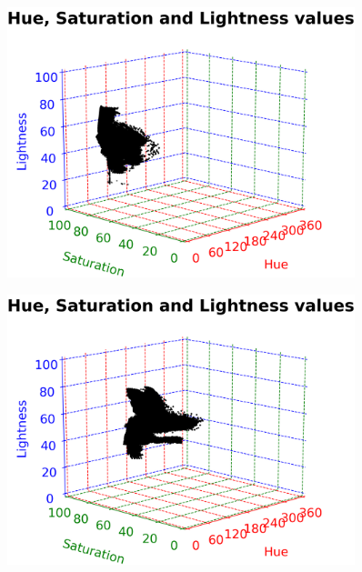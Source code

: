 \vspace{1mm}

\begin{figure}[h!]
	\centering
	\begin{minipage}{0.5\textwidth}
		\centering
		\includegraphics[width=0.9\textwidth]{img/hsl3DGreen.png}
		\captionsetup{width=0.9\textwidth}
		\label{hsl3DGreenPlot}
	\end{minipage}%
	\begin{minipage}{0.5\textwidth}
		\centering
		\includegraphics[width=0.9\textwidth]{img/hsl3DBlueGreen.png}
		\captionsetup{width=0.9\textwidth}
		\label{hsl3DBlueGreenPlot}
	\end{minipage}
\end{figure}

